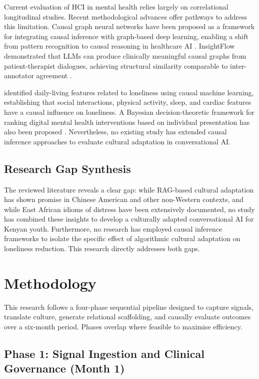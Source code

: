 \documentclass[12pt,a4paper]{article}
\begin{document}
Current evaluation of HCI in mental health relies largely on correlational longitudinal studies. Recent methodological advances offer pathways to address this limitation. Causal graph neural networks have been proposed as a framework for integrating causal inference with graph-based deep learning, enabling a shift from pattern recognition to causal reasoning in healthcare AI \citep{Mesinovic2026}. InsightFlow demonstrated that LLMs can produce clinically meaningful causal graphs from patient-therapist dialogues, achieving structural similarity comparable to inter-annotator agreement \citep{Gupta2026}.

\citet{Wang2025} identified daily-living features related to loneliness using causal machine learning, establishing that social interactions, physical activity, sleep, and cardiac features have a causal influence on loneliness. A Bayesian decision-theoretic framework for ranking digital mental health interventions based on individual presentation has also been proposed \citep{CausalAIRec2025}. Nevertheless, no existing study has extended causal inference approaches to evaluate cultural adaptation in conversational AI.

\subsection{Research Gap Synthesis}

The reviewed literature reveals a clear gap: while RAG-based cultural adaptation has shown promise in Chinese American and other non-Western contexts, and while East African idioms of distress have been extensively documented, no study has combined these insights to develop a culturally adapted conversational AI for Kenyan youth. Furthermore, no research has employed causal inference frameworks to isolate the specific effect of algorithmic cultural adaptation on loneliness reduction. This research directly addresses both gaps.

\section{Methodology}

This research follows a four-phase sequential pipeline designed to capture signals, translate culture, generate relational scaffolding, and causally evaluate outcomes over a six-month period. Phases overlap where feasible to maximise efficiency.

\subsection{Phase 1: Signal Ingestion and Clinical Governance (Month 1)}
\end{document}
